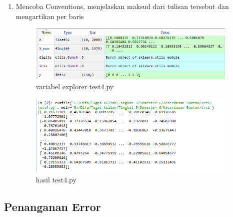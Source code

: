 \begin{enumerate}
	
		\item Mencoba Conventions, menjelaskan maksud dari tulisan tersebut dan mengartikan per baris
						
	
			\begin{figure}[H]
				\begin{center}
				 \includegraphics[width=10cm]{figures/1174076/figures1/test4ve.PNG}
				 \caption{variabel explorer test4.py}	
				\end{center}
			\end{figure}
			
			\begin{figure}[H]
				\begin{center}
				 \includegraphics[width=10cm]{figures/1174076/figures1/test4.PNG}
				 \caption{hasil test4.py}	
				\end{center}
			\end{figure}
	
	\end{enumerate}
	

\subsection{Penanganan Error}

